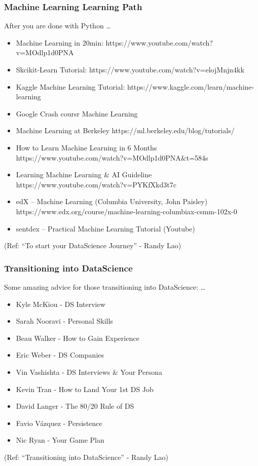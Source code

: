 \begin{frame}\frametitle{Machine Learning Learning Path}
After you are done with Python \ldots

\footnotesize
\begin{itemize}
\item Machine Learning in 20min: https://www.youtube.com/watch?v=MOdlp1d0PNA
\item Skcikit-Learn Tutorial: https://www.youtube.com/watch?v=elojMnjn4kk
\item Kaggle Machine Learning Tutorial: https://www.kaggle.com/learn/machine-learning
\item Google Crash coursr Machine Learning 
\item Machine Learning at Berkeley
https://ml.berkeley.edu/blog/tutorials/
\item How to Learn Machine Learning in 6 Months
https://www.youtube.com/watch?v=MOdlp1d0PNA\&t=584s
\item Learning Machine Learning \& AI Guideline
https://www.youtube.com/watch?v=PYKfXkd3t7c

\item edX – Machine Learning (Columbia University, John Paisley)
https://www.edx.org/course/machine-learning-columbiax-csmm-102x-0
\item sentdex – Practical Machine Learning Tutorial (Youtube)
\end{itemize}

(Ref: ``To start your DataScience Journey'' - Randy Lao)
\end{frame}


\begin{frame}\frametitle{Transitioning into DataScience}
Some amazing advice for those transitioning into DataScience: \ldots

\footnotesize
\begin{itemize}
\item Kyle McKiou - DS Interview
\item Sarah Nooravi - Personal Skills
\item Beau Walker - How to Gain Experience
\item Eric Weber - DS Companies
\item Vin Vashishta - DS Interviews \& Your Persona
\item Kevin Tran - How to Land Your 1st DS Job
\item David Langer - The 80/20 Rule of DS
\item Favio Vázquez - Persistence 
\item Nic Ryan - Your Game Plan
\end{itemize}

(Ref: ``Transitioning into DataScience'' - Randy Lao)
\end{frame}

